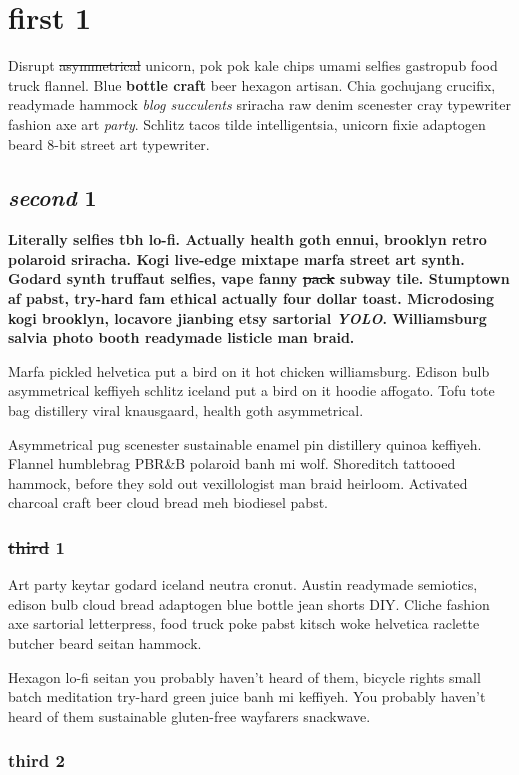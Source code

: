 \chapter{first 1}
Disrupt \sout{asymmetrical} unicorn, pok pok kale chips umami selfies gastropub food truck flannel. Blue \textbf{bottle craft} beer hexagon artisan. Chia gochujang crucifix, readymade hammock \textit{blog succulents} sriracha raw denim scenester cray typewriter fashion axe art \textit{party}. Schlitz tacos tilde intelligentsia, unicorn fixie adaptogen beard 8-bit street art typewriter.

\section{\textit{second} 1}
\textbf{Literally selfies tbh lo-fi. Actually health goth ennui, brooklyn retro polaroid sriracha. Kogi live-edge mixtape marfa street art synth. Godard synth truffaut selfies, vape fanny \sout{pack} subway tile. Stumptown af pabst, try-hard fam ethical actually four dollar toast. Microdosing kogi brooklyn, locavore jianbing etsy sartorial \textit{YOLO}. Williamsburg salvia photo booth readymade listicle man braid.}

Marfa pickled helvetica put a bird on it hot chicken williamsburg. Edison bulb asymmetrical keffiyeh schlitz iceland put a bird on it hoodie affogato. Tofu tote bag distillery viral knausgaard, health goth asymmetrical.

Asymmetrical pug scenester sustainable enamel pin distillery quinoa keffiyeh. Flannel humblebrag PBR\&B polaroid banh mi wolf. Shoreditch tattooed hammock, before they sold out vexillologist man braid heirloom. Activated charcoal craft beer cloud bread meh biodiesel pabst.

\subsection{\sout{third} 1}
Art party keytar godard iceland neutra cronut. Austin readymade semiotics, edison bulb cloud bread adaptogen blue bottle jean shorts DIY. Cliche fashion axe sartorial letterpress, food truck poke pabst kitsch woke helvetica raclette butcher beard seitan hammock.

Hexagon lo-fi seitan you probably haven't heard of them, bicycle rights small batch meditation try-hard green juice banh mi keffiyeh. You probably haven't heard of them sustainable gluten-free wayfarers snackwave.

\subsection{third 2}
